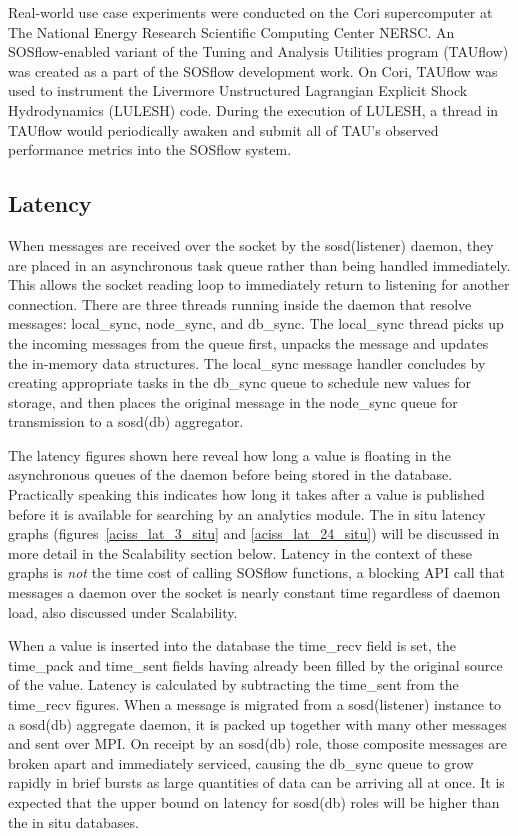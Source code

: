 Real-world use case experiments were conducted on the Cori
supercomputer at The National Energy Research Scientific Computing
Center NERSC. An SOSflow-enabled variant of the Tuning and Analysis
Utilities program (TAUflow) was created as a part of the SOSflow
development work. On Cori, TAUflow was used to instrument the
Livermore Unstructured Lagrangian Explicit Shock Hydrodynamics
(LULESH) code. During the execution of LULESH, a thread in TAUflow
would periodically awaken and submit all of TAU's observed performance
metrics into the SOSflow system.

\subsection{Latency}

When messages are received over the socket by the sosd(listener)
daemon, they are placed in an asynchronous task queue rather than
being handled immediately. This allows the socket reading loop to
immediately return to listening for another connection.  There are
three threads running inside the daemon that resolve messages:
local\_sync, node\_sync, and db\_sync.  The local\_sync thread picks up
the incoming messages from the queue first, unpacks the message and
updates the in-memory data structures. The local\_sync message handler
concludes by creating appropriate tasks in the db\_sync queue to
schedule new values for storage, and then places the original message
in the node\_sync queue for transmission to a sosd(db) aggregator.

The latency figures shown here reveal how long a value is floating in
the asynchronous queues of the daemon before being stored in the
database. Practically speaking this indicates how long it takes after
a value is published before it is available for searching by an
analytics module.  The in situ latency graphs
(figures~\ref{aciss_lat_3_situ} and \ref{aciss_lat_24_situ}) will be
discussed in more detail in the Scalability section below. Latency in
the context of these graphs is \textit{not} the time cost of calling
SOSflow functions, a blocking API call that messages a daemon over the
socket is nearly constant time regardless of daemon load, also discussed
under Scalability.

When a value is inserted into the database the time\_recv field is set,
the time\_pack and time\_sent fields having already been filled by the
original source of the value.  Latency is calculated by subtracting
the time\_sent from the time\_recv figures. When a message is migrated
from a sosd(listener) instance to a sosd(db) aggregate daemon, it is
packed up together with many other messages and sent over MPI.  On
receipt by an sosd(db) role, those composite messages are broken apart
and immediately serviced, causing the db\_sync queue to grow rapidly in
brief bursts as large quantities of data can be arriving all at once.
It is expected that the upper bound on latency for sosd(db) roles will
be higher than the in situ databases.

